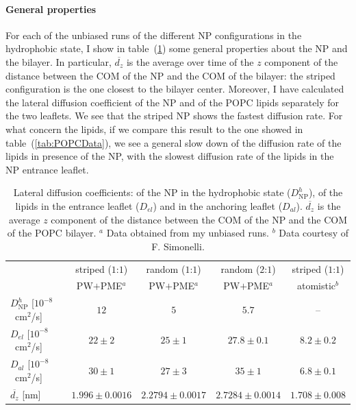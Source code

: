 \paragraph{\textbf{General properties}} For each of the unbiased runs of the different \ac{NP} configurations in 
the hydrophobic state, I show in table~(\ref{tab:NPMembProperties}) some general properties about the \ac{NP} and 
the bilayer. In particular, $\overline{d_z}$ is the average over time of the $z$ component of the distance between 
the \ac{COM} of the \ac{NP} and the \ac{COM} of the bilayer: the striped configuration is the one closest to the 
bilayer center. Moreover, I have calculated the lateral diffusion coefficient of the \ac{NP} and of the \ac{POPC} 
lipids separately for the two leaflets. We see that the striped \ac{NP} shows the fastest diffusion rate. For what 
concern the lipids, if we compare this result to the one showed in table~(\ref{tab:POPCData}), we see a general 
slow down of the diffusion rate of the lipids in presence of the \ac{NP}, with the slowest diffusion rate of the 
lipids in the \ac{NP} entrance leaflet.
\begin{table}[h!t]
	\centering\footnotesize
	\begin{tabular}{lcccc}
		\toprule
		\,		& striped ($1$:$1$)		& random ($1$:$1$)		& random ($2$:$1$)	& striped ($1$:$1$)	\\
		\,		& \acs{PW}$+$\acs{PME}$^a$ & \acs{PW}$+$\acs{PME}$^a$ & \acs{PW}$+$\acs{PME}$^a$ & atomistic$^b$ \\ \toprule
		$D^h_{\text{NP}}$ [$10^{-8}$~cm$^2$/s] & $12$ & $5$ & $5.7$ & –		 \\ \midrule
		$D_{el}$ [$10^{-8}$~cm$^2$/s] & $22 \pm 2$ & $25 \pm 1$ & $27.8 \pm 0.1$ & $8.2 \pm 0.2$	\\ \midrule
		$D_{al}$ [$10^{-8}$~cm$^2$/s] & $30 \pm 1$ & $27 \pm 3$	& $35 \pm 1$	& $6.8 	\pm 0.1$		\\ \midrule
		$\overline{d_z}$ [nm] & $1.996 \pm 0.0016$	& $2.2794 \pm 0.0017$	& $2.7284 \pm 0.0014$	& $1.708 \pm 0.008$\\ \bottomrule
	\end{tabular}
	\caption{Lateral diffusion coefficients: of the \acs{NP} in the hydrophobic state ($D^h_\text{NP}$), of the lipids in the entrance leaflet ($D_{el}$) and in the anchoring leaflet ($D_{al}$). $\overline{d_z}$ is the average $z$ component of the distance between the \acs{COM} of the \acs{NP} and the \acs{COM} of the \acs{POPC} bilayer. $^a$ Data obtained from my unbiased runs. $^b$ Data courtesy of F. Simonelli.}%
	\label{tab:NPMembProperties}
\end{table}

